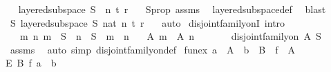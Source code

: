 \begin{isabellebody}
\ \isamarkupfalse%
\ {\isachardoublequoteopen}layered{\isacharunderscore}{\kern0pt}subspace\ S\ {}\ n\ t\ r\ {\isasymchi}{\isachardoublequoteclose}\ \isamarkupfalse%
\ S{\isacharunderscore}{\kern0pt}prop\ assms\ \isamarkupfalse%
\ layered{\isacharunderscore}{\kern0pt}subspace{\isacharunderscore}{\kern0pt}def\ \isamarkupfalse%
\ blast\isanewline
\ \ \isamarkupfalse%
\ \isamarkupfalse%
\ {\isachardoublequoteopen}{\isasymexists}S{\isachardot}{\kern0pt}\ layered{\isacharunderscore}{\kern0pt}subspace\ S\ {\isacharparenleft}{\kern0pt}{}{\isacharcolon}{\kern0pt}{\isacharcolon}{\kern0pt}nat{\isacharparenright}{\kern0pt}\ n\ t\ r\ {\isasymchi}{\isachardoublequoteclose}\ \isamarkupfalse%
\ auto\isanewline
{}\isamarkupfalse%
%
\endisatagproof
{\isafoldproof}%
%
\isadelimproof
\isanewline
%
\endisadelimproof
\isanewline
{}\isamarkupfalse%
\ disjoint{\isacharunderscore}{\kern0pt}family{\isacharunderscore}{\kern0pt}onI\ {\isacharbrackleft}{\kern0pt}intro{\isacharbrackright}{\kern0pt}{\isacharcolon}{\kern0pt}\isanewline
\ \ \ {\isachardoublequoteopen}{\isasymAnd}m\ n{\isachardot}{\kern0pt}\ m\ {\isasymin}\ S\ {\isasymLongrightarrow}\ n\ {\isasymin}\ S\ {\isasymLongrightarrow}\ m\ {\isasymnoteq}\ n\isanewline
\ \ {\isasymLongrightarrow}\ A\ m\ {\isasyminter}\ A\ n\ {\isacharequal}{\kern0pt}\ {\isacharbraceleft}{\kern0pt}{\isacharbraceright}{\kern0pt}{\isachardoublequoteclose}\isanewline
\ \ \ \ \ {\isachardoublequoteopen}disjoint{\isacharunderscore}{\kern0pt}family{\isacharunderscore}{\kern0pt}on\ A\ S{\isachardoublequoteclose}\isanewline
%
\isadelimproof
\ \ %
\endisadelimproof
%
\isatagproof
{}\isamarkupfalse%
\ assms\ \isamarkupfalse%
\ {\isacharparenleft}{\kern0pt}auto\ simp{\isacharcolon}{\kern0pt}\ disjoint{\isacharunderscore}{\kern0pt}family{\isacharunderscore}{\kern0pt}on{\isacharunderscore}{\kern0pt}def{\isacharparenright}{\kern0pt}%
\endisatagproof
{\isafoldproof}%
%
\isadelimproof
\isanewline
%
\endisadelimproof
\isanewline
{}\isamarkupfalse%
\ fun{\isacharunderscore}{\kern0pt}ex{\isacharcolon}{\kern0pt}\ {\isachardoublequoteopen}a\ {\isasymin}\ A\ {\isasymLongrightarrow}\ b\ {\isasymin}\ B\ {\isasymLongrightarrow}\ {\isasymexists}f\ {\isasymin}\ A\isanewline
{\isasymrightarrow}\isactrlsub E\ B{\isachardot}{\kern0pt}\ f\ a\ {\isacharequal}{\kern0pt}\ b{\isachardoublequoteclose}\ \isanewline
%
\isadelimproof

\end{isabellebody}
